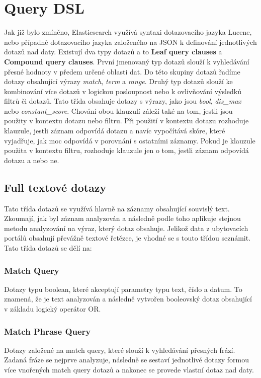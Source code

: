 \documentclass[czech,BP]{thesiskiv}
\begin{document}
\section{Query DSL}
Jak již bylo zmíněno, Elasticsearch využívá syntaxi dotazovacího jazyka Lucene, nebo případně dotazovacího jazyka založeného na JSON k definování jednotlivých dotazů nad daty. Existují dva typy dotazů a to \textbf{Leaf query clauses} a \textbf{Compound query clauses}. První jmenovaný typ dotazů slouží k vyhledávání přesné hodnoty v předem určené oblasti dat. Do této skupiny dotazů řadíme dotazy obsahující výrazy \textit{match}, \textit{term} a \textit{range}. Druhý typ dotazů slouží ke kombinování více dotazů v logickou posloupnost nebo k ovlivňování výsledků filtrů či dotazů. Tato třída obsahuje dotazy s výrazy, jako jsou \textit{bool}, \textit{dis\_max} nebo \textit{constant\_score}. Chování obou klauzulí záleží také na tom, jestli jsou použity v kontextu dotazu nebo filtru. Při použití v kontextu dotazu rozhoduje klauzule, jestli záznam odpovídá dotazu a navíc vypočítává skóre, které vyjadřuje, jak moc odpovídá v porovnání s ostatními záznamy. Pokud je klauzule použita v kontextu filtru, rozhoduje klauzule jen o tom, jestli záznam odpovídá dotazu a nebo ne. \cite{QueryDSL}

\subsection{Full textové dotazy}
Tato třída dotazů se využívá hlavně na záznamy obsahující souvislý text. Zkoumají, jak byl záznam analyzován a následně podle toho aplikuje stejnou metodu analyzování na výraz, který dotaz obsahuje. Jelikož data z ubytovacích portálů obsahují převážně textové řetězce, je vhodné se s touto třídou seznámit. Tato třída dotazů se dělí na:
\subsubsection{Match Query}
Dotazy typu boolean, které akceptují parametry typu text, číslo a datum. To znamená, že je text analyzován a následně vytvořen booleovský dotaz obsahující v základu logický operátor OR.
\subsubsection{Match Phrase Query}
Dotazy založené na match query, které slouží k vyhledávání přesných frází. Zadaná fráze se nejprve analyzuje, následně se sestaví jednotlivé dotazy formou více vnořených match query dotazů a nakonec se provede vlastní dotaz nad daty.
\end{document}
